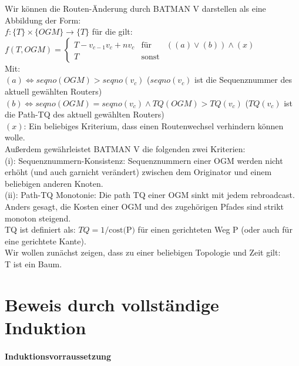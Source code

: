 \documentclass[a4paper,10pt]{scrartcl}[2003/01/01] %
\begin{document}
Wir können die Routen-Änderung durch BATMAN V darstellen als eine Abbildung der Form: \\
$f: \{T\} \times \{OGM\} \rightarrow \{T\}$ für die gilt: \\

$f(T, OGM) = \left\{ \begin{array}{rcl} T - v_{c-1}v_c + nv_c & \mbox{für} & ((a) \vee (b)) \wedge (x) \\
					T & \mbox{sonst} & \end{array} \right.$ \\

Mit: \\
$(a) \Leftrightarrow seqno(OGM) > seqno(v_c)$ ($seqno(v_c)$ ist die Sequenznummer des aktuell gewählten Routers) \\
$(b) \Leftrightarrow seqno(OGM) = seqno(v_c) \wedge TQ(OGM) > TQ(v_c)$ ($TQ(v_c)$ ist die Path-TQ des aktuell gewählten Routers) \\
$(x)$: Ein beliebiges Kriterium, dass einen Routenwechsel verhindern können wolle. \\

Außerdem gewährleistet BATMAN V die folgenden zwei Kriterien: \\
(i): Sequenznummern-Konsistenz: Sequenznummern einer OGM werden nicht erhöht (und auch garnicht verändert) zwischen
dem Originator und einem beliebigen anderen Knoten. \\
(ii): Path-TQ Monotonie: Die path TQ einer OGM sinkt mit jedem rebroadcast. Anders gesagt, die Kosten
einer OGM und des zugehörigen Pfades sind strikt monoton steigend. \\

TQ ist definiert als: $TQ = 1 / \text{cost(P)}$ für einen gerichteten Weg P (oder auch für eine gerichtete Kante). \\

Wir wollen zunächst zeigen, dass zu einer beliebigen Topologie und Zeit gilt: \\

T ist ein Baum. \\

\newpage

\section*{Beweis durch vollständige Induktion}

\paragraph{Induktionsvorraussetzung}
\end{document}
